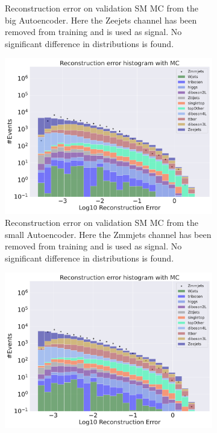 \begin{figure}[H]
\begin{subfigure}{.45\textwidth}
        \caption{Reconstruction error on validation SM MC from the big Autoencoder. Here the Zeejets channel has been removed from training and 
        is used as signal. No significant difference in distributions is found. }
        \label{fig:ae_big_Zeejets}
    \end{subfigure}
    \hfill 
    \begin{subfigure}{.45\textwidth}
        \includegraphics[width=\textwidth]{Figures/AE_testing/small/b_data_recon_big_rm3_feats_sig_Zmmjets.pdf}
        \caption{Reconstruction error on validation SM MC from the small Autoencoder. Here the Zmmjets channel has been removed from training and 
        is used as signal. No significant difference in distributions is found. }
        \label{fig:ae_small_Zmmjets}
    \end{subfigure}
    \hfill
    \begin{subfigure}{.45\textwidth}
        \includegraphics[width=\textwidth]{Figures/AE_testing/big/b_data_recon_big_rm3_feats_sig_Zmmjets.pdf}

\end{subfigure}
\end{figure}
